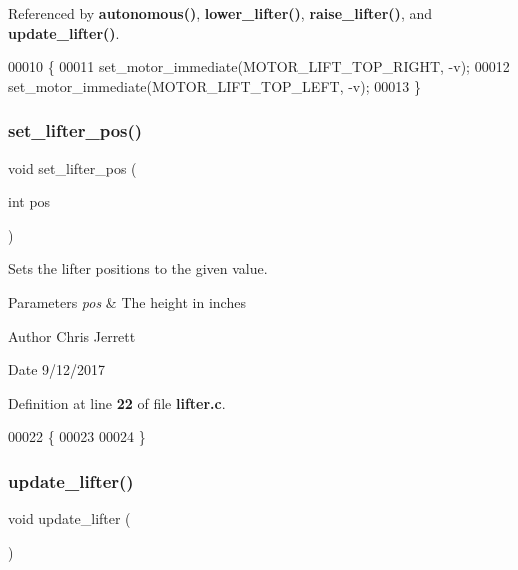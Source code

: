Referenced by \textbf{ autonomous()}, \textbf{ lower\+\_\+lifter()}, \textbf{ raise\+\_\+lifter()}, and \textbf{ update\+\_\+lifter()}.


\begin{DoxyCode}
00010                                     \{
00011   set_motor_immediate(MOTOR_LIFT_TOP_RIGHT, -v);
00012   set_motor_immediate(MOTOR_LIFT_TOP_LEFT, -v);
00013 \}
\end{DoxyCode}
\mbox{\label{lifter_8c_abddc7cb502e12fa277b627c90a45efb1}} 
\subsubsection{set\+\_\+lifter\+\_\+pos()}
{\footnotesize\ttfamily void set\+\_\+lifter\+\_\+pos (\begin{DoxyParamCaption}\item[{int}]{pos }\end{DoxyParamCaption})}



Sets the lifter positions to the given value. 


\begin{DoxyParams}{Parameters}
{\em pos} & The height in inches \\
\hline
\end{DoxyParams}
\begin{DoxyAuthor}{Author}
Chris Jerrett 
\end{DoxyAuthor}
\begin{DoxyDate}{Date}
9/12/2017 
\end{DoxyDate}


Definition at line \textbf{ 22} of file \textbf{ lifter.\+c}.


\begin{DoxyCode}
00022                              \{
00023 
00024 \}
\end{DoxyCode}
\mbox{\label{lifter_8c_a59bb7413777ca16aba124aaedf95c79b}} 
\subsubsection{update\+\_\+lifter()}
{\footnotesize\ttfamily void update\+\_\+lifter (\begin{DoxyParamCaption}{ }\end{DoxyParamCaption})}



